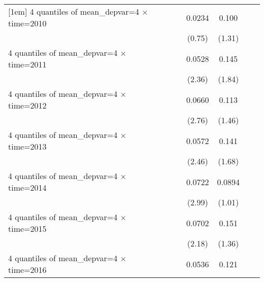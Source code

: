 \begin{table}[htbp]
\begin{tabular}{l*{6}{c}}
[1em]
4 quantiles of mean\_depvar=4 $\times$ time=2010&                     &                     &      0.0234         &       0.100         &                     &                     \\
                    &                     &                     &      (0.75)         &      (1.31)         &                     &                     \\
[1em]
4 quantiles of mean\_depvar=4 $\times$ time=2011&                     &                     &      0.0528\sym{**} &       0.145\sym{*}  &                     &                     \\
                    &                     &                     &      (2.36)         &      (1.84)         &                     &                     \\
[1em]
4 quantiles of mean\_depvar=4 $\times$ time=2012&                     &                     &      0.0660\sym{**} &       0.113         &                     &                     \\
                    &                     &                     &      (2.76)         &      (1.46)         &                     &                     \\
[1em]
4 quantiles of mean\_depvar=4 $\times$ time=2013&                     &                     &      0.0572\sym{**} &       0.141         &                     &                     \\
                    &                     &                     &      (2.46)         &      (1.68)         &                     &                     \\
[1em]
4 quantiles of mean\_depvar=4 $\times$ time=2014&                     &                     &      0.0722\sym{***}&      0.0894         &                     &                     \\
                    &                     &                     &      (2.99)         &      (1.01)         &                     &                     \\
[1em]
4 quantiles of mean\_depvar=4 $\times$ time=2015&                     &                     &      0.0702\sym{**} &       0.151         &                     &                     \\
                    &                     &                     &      (2.18)         &      (1.36)         &                     &                     \\
[1em]
4 quantiles of mean\_depvar=4 $\times$ time=2016&                     &                     &      0.0536         &       0.121         &                     &                     \\

\end{tabular}
\end{table}
